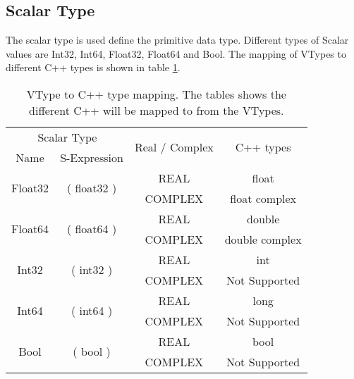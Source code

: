 \subsection{Scalar Type}
The scalar type is used define the primitive data type.
Different types of Scalar values are Int32, Int64, Float32, Float64 and Bool.
The mapping of VTypes to different C++ types is shown in table \ref{tab:typeMap}.
\begin{table}[h]
\centering
\begin{tabular}{|c|c|c|c|}
\hline
\multicolumn{2}{|c|}{Scalar Type}                                                                 & \multirow{2}{*}{Real / Complex}  & \multirow{2}{*}{C++ types} \\ \cline{1-2}
Name                                         & S-Expression                                      &                              &                            \\ \hline
\multirow{2}{*}{Float32}                     & \multicolumn{1}{c|}{\multirow{2}{*}{( float32 )}} & REAL                         & float                        \\ \cline{3-4} 
                                             & \multicolumn{1}{c|}{}                             & \multicolumn{1}{c|}{COMPLEX} & float complex              \\ \hline
\multirow{2}{*}{Float64}                     & \multicolumn{1}{c|}{\multirow{2}{*}{( float64 )}} & REAL                         & double                       \\ \cline{3-4} 
                                             & \multicolumn{1}{c|}{}                             & \multicolumn{1}{c|}{COMPLEX} & double complex             \\ \hline
\multicolumn{1}{|c|}{\multirow{2}{*}{Int32}} & \multirow{2}{*}{( int32 )}                        & REAL                         & int                      \\ \cline{3-4} 
\multicolumn{1}{|c|}{}                       &                                                   & \multicolumn{1}{c|}{COMPLEX} & Not Supported                          \\ \hline
\multicolumn{1}{|c|}{\multirow{2}{*}{Int64}} & \multirow{2}{*}{( int64 )}                        & REAL                         & long                     \\ \cline{3-4} 
\multicolumn{1}{|c|}{}                       &                                                   & \multicolumn{1}{c|}{COMPLEX} & Not Supported                          \\ \hline
\multicolumn{1}{|c|}{\multirow{2}{*}{Bool}} & \multirow{2}{*}{( bool )}                        & REAL                         & bool                     \\ \cline{3-4} 
\multicolumn{1}{|c|}{}                       &                                                   & \multicolumn{1}{c|}{COMPLEX} & Not Supported                          \\ \hline
\end{tabular}
\caption[VType to C++ type mapping]{VType to C++ type mapping. The tables shows the different C++ will be mapped to from the VTypes.} 
\label{tab:typeMap}
\end{table}
